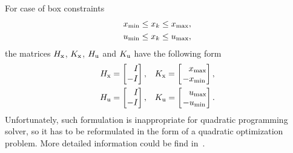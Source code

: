 For case of box constraints
\begin{subequations}
	\begin{align}
		x _{\text{min}}\leq x_k \leq x _{\text{max}},\\
		u _{\text{min}}\leq x_k \leq u _{\text{max}},\\
	\end{align}
\end{subequations}
the matrices $H _{\text{x}}$, $K _{\text{x}}$, $H _{\text{u}}$ and $K _{\text{u}}$ have the following form
\begin{subequations}
	\begin{align}
		H _{\text{x}} = \begin{bmatrix}
						\ \ \,I\\-I
					\end{bmatrix},\quad & 
		K _{\text{x}} = \begin{bmatrix}
						\ \ \,x _{\text{max}}\\-x _{\text{min}}
					\end{bmatrix},\\
		H _{\text{u}} = \begin{bmatrix}
						\ \ \,I\\-I
					\end{bmatrix},\quad & 
		K _{\text{u}} = \begin{bmatrix}
						\ \ \,u _{\text{max}}\\-u _{\text{min}}
					\end{bmatrix}.
	\end{align}
\end{subequations}
Unfortunately, such formulation is inappropriate for quadratic programming solver, so it has to be reformulated in the form of a quadratic optimization problem. More detailed information could be find in~\cite{MPC:kniha}.
